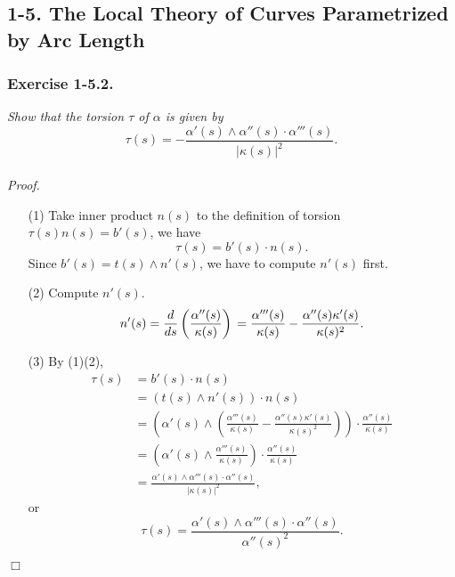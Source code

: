 \documentclass{article}
\begin{document}



\subsection*{1-5. The Local Theory of Curves Parametrized by Arc Length \\}



\subsubsection*{Exercise 1-5.2.}
\emph{Show that the torsion $\tau$ of $\alpha$ is given by
$$\tau(s) = -\frac{\alpha'(s) \wedge \alpha''(s) \cdot \alpha'''(s)}{|\kappa(s)|^2}.$$} \\



\emph{Proof.}
\begin{enumerate}
\item[(1)]
  Take inner product $n(s)$
  to the definition of torsion $\tau(s) n(s) = b'(s)$,
  we have $$\tau(s) = b'(s) \cdot n(s).$$
  Since $b'(s) = t(s) \wedge n'(s)$, we have to compute $n'(s)$ first.
\item[(2)]
  Compute $n'(s)$.
  $$n'(s)
  = \frac{d}{ds} \left( \frac{\alpha''(s)}{\kappa(s)} \right) \\
  = \frac{\alpha'''(s)}{\kappa(s)} - \frac{\alpha''(s)\kappa'(s)}{\kappa(s)^2}.$$
\item[(3)]
  By (1)(2),
  \begin{align*}
  \tau(s)
  &= b'(s) \cdot n(s) \\
  &= (t(s) \wedge n'(s)) \cdot n(s) \\
  &= \left(
    \alpha'(s)
      \wedge
    \left(
      \frac{\alpha'''(s)}{\kappa(s)}
      - \frac{\alpha''(s)\kappa'(s)}{\kappa(s)^2}
    \right)
  \right)
  \cdot \frac{\alpha''(s)}{\kappa(s)} \\
  &= \left(
    \alpha'(s) \wedge \frac{\alpha'''(s)}{\kappa(s)}
  \right)
  \cdot \frac{\alpha''(s)}{\kappa(s)} \\
  &= \frac{\alpha'(s) \wedge \alpha'''(s) \cdot \alpha''(s)}{|\kappa(s)|^2},
  \end{align*}
  or
  $$\tau(s) = \frac{\alpha'(s) \wedge \alpha'''(s) \cdot \alpha''(s)}{\alpha''(s)^2}.$$
\end{enumerate}
$\Box$ \\\\
\end{document}
